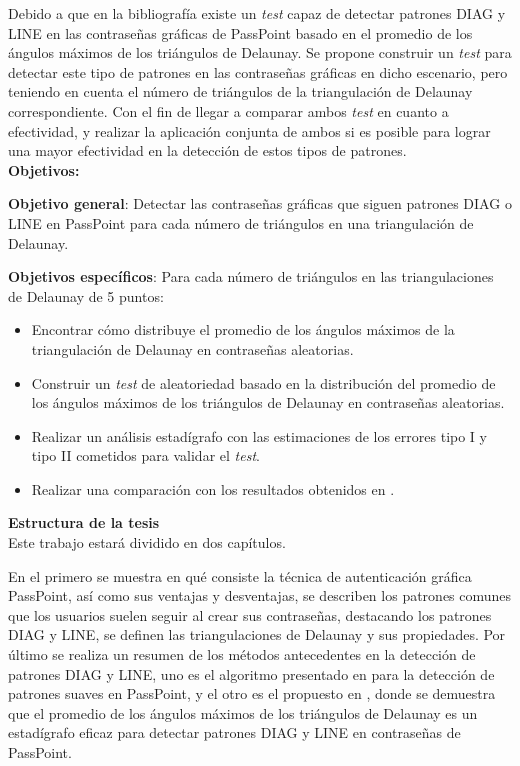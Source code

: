 \documentclass[12pt]{report}
\begin{document}
	\normalsize{
		Debido a que en la bibliografía existe un \textit{test} capaz de detectar patrones DIAG y LINE en las contraseñas gráficas de PassPoint basado en el promedio de los ángulos máximos de los triángulos de Delaunay. Se propone construir un \textit{test} para detectar este tipo de patrones en las contraseñas gráficas en dicho escenario, pero teniendo en cuenta el número de triángulos de la triangulación de Delaunay correspondiente. Con el fin de llegar a comparar ambos \textit{test} en cuanto a efectividad, y realizar la aplicación conjunta de ambos si es posible para lograr una mayor efectividad en la detección de estos tipos de patrones.
		}\\

	\large{\textbf{Objetivos:}}
	
	\normalsize{\textbf{Objetivo general}}: Detectar las contraseñas gráficas que siguen patrones DIAG o LINE en PassPoint para cada número de triángulos en una triangulación de Delaunay.
	
	\normalsize{\textbf{Objetivos específicos}}:
	Para cada número de triángulos  en las triangulaciones de Delaunay de 5 puntos:
	
	\begin{itemize}
		\item Encontrar cómo distribuye el promedio de los ángulos máximos de la triangulación de Delaunay en contraseñas aleatorias.
		\item Construir un \textit{test} de aleatoriedad basado en la distribución del promedio de los ángulos máximos de los triángulos de Delaunay en contraseñas aleatorias.
		
		\item Realizar un análisis estadígrafo con las estimaciones de los errores tipo I y tipo II cometidos para validar el \textit{test}.
		
		\item Realizar una comparación con los resultados obtenidos en \cite{13}.
		
	\end{itemize}
	
	
	{\large{\textbf{Estructura de la tesis}}}\\
	
	Este trabajo estará dividido en dos capítulos.
	
	En el primero se muestra en qué consiste la técnica de autenticación gráfica PassPoint, así como sus ventajas y desventajas, se describen los patrones comunes que los usuarios suelen seguir al crear sus contraseñas, destacando los patrones DIAG y LINE, se definen las triangulaciones de Delaunay y sus propiedades. Por último se realiza un resumen  de los métodos antecedentes en la detección de patrones DIAG y LINE, uno es el algoritmo presentado en \cite{3} para la detección de patrones suaves en PassPoint, y el otro es el propuesto en \cite{13}, donde se demuestra que el promedio de los ángulos máximos de los  triángulos de Delaunay es un estadígrafo eficaz para detectar patrones DIAG y LINE en contraseñas de PassPoint.
	
\end{document}
